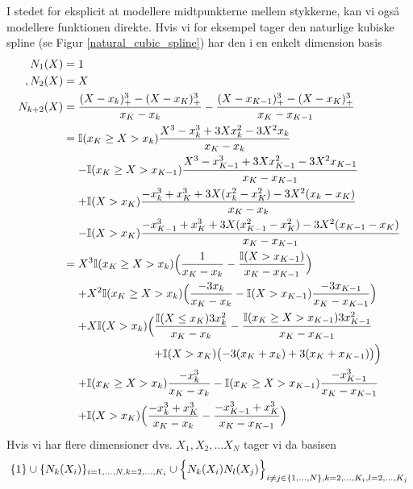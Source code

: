 \documentclass[a4paper, 12pt]{memoir}
\begin{document}
I stedet for eksplicit at modellere midtpunkterne mellem stykkerne, kan vi også modellere funktionen direkte. Hvis vi for eksempel tager den naturlige kubiske spline (se Figur \ref{natural_cubic_spline}) har den i en enkelt dimension basis
\begin{align*}
N_1(X)&=1\\, N_2(X)&=X\\
N_{k+2}(X)&=\frac{(X-x_k)_+^3-(X-x_K)_+^3}{x_K-x_k}-\frac{(X-x_{K-1})^3_+-(X-x_K)^3_+}{x_K-x_{K-1}}\\
&=\begin{lgathered}[t]\mathbb{I}(x_{K}\geq X>x_k)\frac{X^3-x_k^3+3Xx_k^2-3X^2x_k}{x_K-x_k}\\
-\mathbb{I}(x_K\geq X>x_{K-1})\frac{X^3-x_{K-1}^3+3Xx_{K-1}^2-3X^2x_{K-1}}{x_K-x_{K-1}}\\
+\mathbb{I}(X>x_K)\frac{-x_k^3+x_K^3+3X(x_k^2-x_K^2)-3X^2(x_k-x_K)}{x_K-x_k}\\
-\mathbb{I}(X>x_K)\frac{-x_{K-1}^3+x_K^3+3X(x_{K-1}^2-x_K^2)-3X^2(x_{K-1}-x_K)}{x_K-x_{K-1}}\\\end{lgathered}\\
&=\begin{lgathered}[t]X^3\mathbb{I}(x_{K}\geq X>x_k) \Bigl(\frac{1}{x_K-x_k}-\frac{\mathbb{I}(X>x_{K-1})}{x_K-x_{K-1}}\Bigr)\\
+X^2\mathbb{I}(x_{K}\geq X>x_k) \Bigl(  \frac{-3x_k}{x_K-x_k}-\mathbb{I}( X>x_{K-1})\frac{-3x_{K-1}}{x_K-x_{K-1}}  \Bigr)\\
+X\mathbb{I}(X>x_k)\Bigl(
           \begin{lgathered}[t]
                        \frac{\mathbb{I}(X\leq x_K) 3x_k^2}{x_K-x_k}-\frac{\mathbb{I}(x_K\geq X>x_{K-1})3x_{K-1}^2}{x_{K}-x_{K-1}}\\
                        +\mathbb{I}(X>x_K) \bigl(-3(x_K+x_k)+3(x_K+x_{K-1})\bigr)
           \Bigr)
 \end{lgathered}\\
 + \mathbb{I}(x_{K}\geq X>x_k)\frac{-x_k^3}{x_K-x_k}-\mathbb{I}(x_{K}\geq X>x_{K-1})\frac{-x_{K-1}^3}{x_K-x_{K-1}}\\
+ \mathbb{I}(X>x_K)\Bigl(\frac{-x_k^3+x_K^3}{x_K-x_{k}}-\frac{-x_{K-1}^3+x_K^3}{x_K-x_{K-1}}\Bigr)
\end{lgathered}
\end{align*}
Hvis vi har flere dimensioner dvs. $X_1, X_2, \dots X_N$ tager vi da basisen
\begin{equation}
\{1\}\cup \{N_k(X_i)\}_{i=1,\dots, N, k=2, \dots, K_i}\cup\Bigl\{N_k(X_i)N_l(X_j)\Bigr\}_{i\neq j\in \{1, \dots, N\}, k=2, \dots, K_i, l=2, \dots, K_j}
\end{equation}
\end{document}
